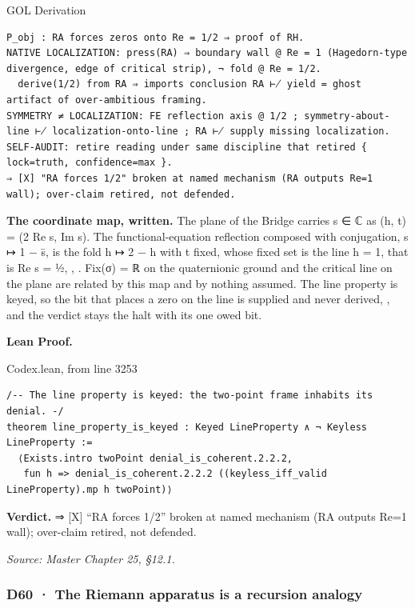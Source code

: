 \documentclass[10pt,twocolumn]{article}
\begin{document}
\begin{golbox}{GOL Derivation}
\begin{lstlisting}[style=golv]
P_obj : RA forces zeros onto Re = 1/2 ⇒ proof of RH.
NATIVE LOCALIZATION: press(RA) ⇒ boundary wall @ Re = 1 (Hagedorn-type divergence, edge of critical strip), ¬ fold @ Re = 1/2.
  derive(1/2) from RA ⇒ imports conclusion RA ⊬ yield = ghost artifact of over-ambitious framing.
SYMMETRY ≠ LOCALIZATION: FE reflection axis @ 1/2 ; symmetry-about-line ⊬ localization-onto-line ; RA ⊬ supply missing localization.
SELF-AUDIT: retire reading under same discipline that retired { lock=truth, confidence=max }.
⇒ [X] "RA forces 1/2" broken at named mechanism (RA outputs Re=1 wall); over-claim retired, not defended.
\end{lstlisting}
\end{golbox}

\textbf{The coordinate map, written.} The plane of the Bridge carries s
∈ ℂ as (h, t) = (2 Re s, Im s). The functional-equation reflection
composed with conjugation, s ↦ 1 − s̄, is the fold h ↦ 2 − h with t
fixed, whose fixed set is the line h = 1, that is Re s = ½,
\texttt{},
\texttt{}. Fix(σ) = ℝ on the
quaternionic ground and the critical line on the plane are related by
this map and by nothing assumed. The line property is keyed, so the bit
that places a zero on the line is supplied and never derived,
\texttt{}, and the verdict
stays the halt with its one owed bit.

\textbf{Lean Proof.}

\begin{leanexcerpt}{Codex.lean, from line 3253}
\begin{lstlisting}[style=leanx,firstnumber=3253]
/-- The line property is keyed: the two-point frame inhabits its denial. -/
theorem line_property_is_keyed : Keyed LineProperty ∧ ¬ Keyless LineProperty :=
  ⟨Exists.intro twoPoint denial_is_coherent.2.2.2,
   fun h => denial_is_coherent.2.2.2 ((keyless_iff_valid LineProperty).mp h twoPoint)⟩
\end{lstlisting}
\end{leanexcerpt}

\textbf{Verdict.} ⇒ {[}X{]} ``RA forces 1/2'' broken at named mechanism
(RA outputs Re=1 wall); over-claim retired, not defended.

\emph{Source: Master Chapter 25, §12.1.}

\hypertarget{d60-the-riemann-apparatus-is-a-recursion-analogy}{%
\subsubsection{D60 · The Riemann apparatus is a recursion
analogy}\label{d60-the-riemann-apparatus-is-a-recursion-analogy}}
\end{document}
